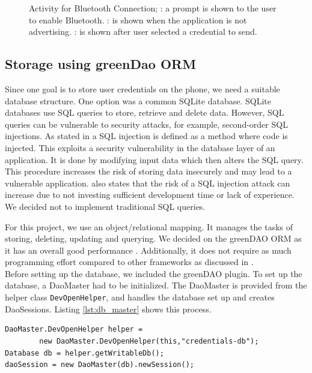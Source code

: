 \begin{figure}[!htb]
\caption[Activity for Bluetooth Connection]{Activity for Bluetooth Connection; \protect{}: a prompt is shown to the user to enable Bluetooth. \protect{}: is shown when the application is not advertising. \protect{}: is shown after user selected a credential to send.}
\label{fig:connectionactivity}
\end{figure}



\subsection{Storage using greenDao ORM}
Since one goal is to store user credentials on the phone, we need a suitable database structure. One option was a common SQLite database. SQLite databases use SQL queries to store, retrieve and delete data. However, SQL queries can be vulnerable to security attacks, for example, second-order SQL injections. As stated in \cite{katole2018detection} a SQL injection is defined as a method where code is injected. This exploits a security vulnerability in the database layer of an application. It is done by modifying input data which then alters the SQL query. This procedure increases the risk of storing data insecurely and may lead to a vulnerable application. \cite{katole2018detection} also states that the risk of a SQL injection attack can increase due to not investing sufficient development time or lack of experience. We decided not to implement traditional SQL queries.

For this project, we use an object/relational mapping. It manages the tasks of storing, deleting, updating and querying. We decided on the greenDAO ORM as it has an overall good performance \cite{Greendao}. Additionally, it does not require as much programming effort compared to other frameworks as discussed in \cite{pu2016understanding}. \\
Before setting up the database, we included the greenDAO plugin. To set up the database, a DaoMaster had to be initialized. The DaoMaster is provided from the helper class \texttt{DevOpenHelper}, and handles the database set up and creates DaoSessions. Listing \ref{lst:db_master} shows this process.

\begin{lstlisting}[float,floatplacement=h, caption=Creation of database, label=lst:db_master]
DaoMaster.DevOpenHelper helper = 
        new DaoMaster.DevOpenHelper(this,"credentials-db");
Database db = helper.getWritableDb();
daoSession = new DaoMaster(db).newSession();
\end{lstlisting}

